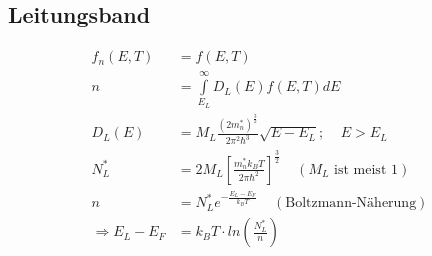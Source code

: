 \documentclass[a4paper,twocolumn,10pt]{article}
\begin{document}
\subsection{Leitungsband}
\begin{equation*}
\begin{split}
f_n(E,T)&=f(E,T)\\
n&=\int\limits_{E_L}^{\infty}D_L(E)f(E,T)dE\\
D_L(E)&=M_L\frac{(2m_n^*)^{\frac{3}{2}}}{2\pi^2\hbar^3}\sqrt{E-E_L};\;\;\;\;E>E_L\\
N_L^*&=2M_L\left[\frac{m_n^*k_BT}{2\pi\hbar^2}\right]^{\frac{3}{2}}\;\;\;\;(M_L\text{ ist meist }1)\\
n&=N_L^*e^{-\frac{E_L-E_F}{k_BT}}\;\;\;\;(\text{Boltzmann-Näherung})\\
\Rightarrow E_L-E_F&=k_BT\cdot ln\left(\frac{N_L^*}{n}\right)
\end{split}
\end{equation*}
\end{document}
